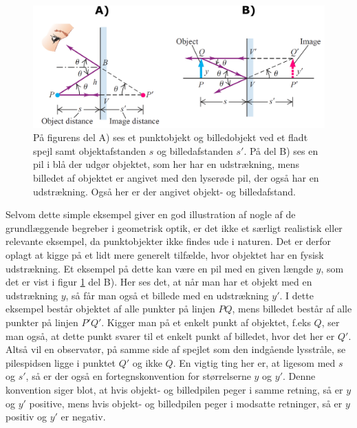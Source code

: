 \begin{figure}[h!]
	\centering
	\includegraphics[scale=0.23]{Geometrisk-Optik/billeddannelse_flad_og_pil.PNG}
	\caption{På figurens del A) ses et punktobjekt og billedobjekt ved et fladt spejl samt objektafstanden $s$ og billedafstanden $s'$. På del B) ses en pil i blå der udgør objektet, som her har en udstrækning, mens billedet af objektet er angivet med den lyserøde pil, der også har en udstrækning. Også her er der angivet objekt- og billedafstand.}
	\label{billeddannelse_flad_og_pil}
\end{figure}
Selvom dette simple eksempel giver en god illustration af nogle af de grundlæggende begreber i geometrisk optik, er det ikke et særligt realistisk eller relevante eksempel, da punktobjekter ikke findes ude i naturen. Det er derfor oplagt at kigge på et lidt mere generelt tilfælde, hvor objektet har en fysisk udstrækning. Et eksempel på dette kan være en pil med en given længde $y$, som det er vist i figur \ref{billeddannelse_flad_og_pil} del B). Her ses det, at når man har et objekt med en udstrækning $y$, så får man også et billede med en udstrækning $y'$. I dette eksempel består objektet af alle punkter på linjen $PQ$, mens billedet består af alle punkter på linjen $P'Q'$. Kigger man på et enkelt punkt af objektet, f.eks $Q$, ser man også, at dette punkt svarer til et enkelt punkt af billedet, hvor det her er $Q'$. Altså vil en observatør, på samme side af spejlet som den indgående lysstråle, se pilespidsen ligge i punktet $Q'$ og ikke $Q$. En vigtig ting her er, at ligesom med $s$ og $s'$, så er der også en fortegnskonvention for størrelserne $y$ og $y'$. Denne konvention siger blot, at hvis objekt- og billedpilen peger i samme retning, så er $y$ og $y'$ positive, mens hvis objekt- og billedpilen peger i modsatte retninger, så er $y$ positiv og $y'$ er negativ.\\

